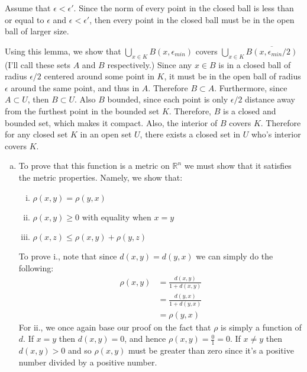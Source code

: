 \documentclass[letterpaper,10pt]{article}
\newenvironment{proof}[1][Proof]{\begin{trivlist}
\item[\hskip \labelsep {\bfseries #1}]}{\end{trivlist}}
\begin{document}
\begin{enumerate}
	\begin{proof}
		Assume that $\epsilon < \epsilon'$. Since the norm of every point in the closed ball is less than or equal to $\epsilon$ and $\epsilon < \epsilon'$, then every point in the closed ball must be in the open ball of larger size.
	\end{proof}

	Using this lemma, we show that $\bigcup_{x \in K} B(x, \epsilon_{min})$ covers $\bigcup_{x \in K} \overline{B(x, \epsilon_{min}/2)}$ (I'll call these sets $A$ and $B$ respectively.) Since any $x \in B$ is in a closed ball of radius $\epsilon/2$ centered around some point in $K$, it must be in the open ball of radius $\epsilon$ around the same point, and thus in $A$. Therefore $B \subset A$. Furthermore, since $A \subset U$, then $B \subset U$. Also $B$ bounded, since each point is only $\epsilon/2$ distance away from the furthest point in the bounded set $K$. Therefore, $B$ is a closed and bounded set, which makes it compact. Also, the interior of $B$ covers $K$. Therefore for any closed set $K$ in an open set $U$, there exists a closed set in $U$ who's interior covers $K$.
	\item
	\begin{enumerate}[a)]
		\item To prove that this function is a metric on $\mathbb{R}^n$ we must show that it satisfies the metric properties. Namely, we show that:
		\begin{enumerate}[i.]
			\item $ \rho(x, y) = \rho(y, x) $
			\item $ \rho(x, y) \geq 0 $ with equality when $x = y$
			\item $ \rho(x, z) \leq \rho(x, y) + \rho(y, z) $
		\end{enumerate}
		To prove i., note that since $d(x,y) = d(y,x)$ we can simply do the following:
		\begin{align*}
			\rho(x, y) & = \frac{d(x,y)}{1+d(x,y)} \\
			& = \frac{d(y,x)}{1+d(y,x)} \\
			& = \rho(y,x)
		\end{align*}
		For ii., we once again base our proof on the fact that $\rho$ is simply a function of $d$. If $x = y$ then $d(x,y) = 0$, and hence $\rho(x,y) = \frac{0}{1} = 0$. If $x \neq y$ then $d(x,y) > 0$ and so $\rho(x,y)$ must be greater than zero since it's a positive number divided by a positive number.


\end{enumerate}
\end{enumerate}
\end{document}
